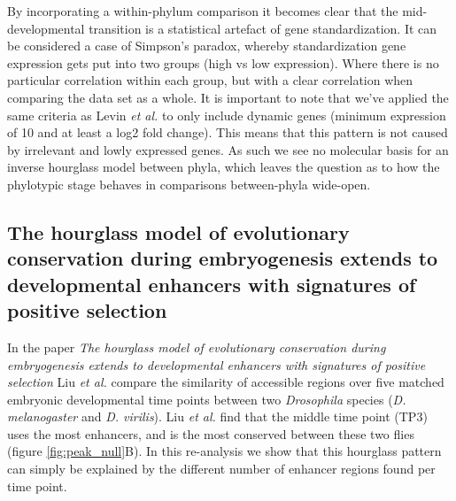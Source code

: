 By incorporating a within-phylum comparison it becomes clear that the mid-developmental transition is a statistical artefact of gene standardization. It can be considered a case of Simpson's paradox, whereby standardization gene expression gets put into two groups (high vs low expression). Where there is no particular correlation within each group, but with a clear correlation when comparing the data set as a whole\cite{Saccenti2023}. It is important to note that we've applied the same criteria as Levin \textit{et al.} to only include dynamic genes (minimum expression of 10 and at least a log2 fold change). This means that this pattern is not caused by irrelevant and lowly expressed genes. As such we see no molecular basis for an inverse hourglass model between phyla, which leaves the question as to how the phylotypic stage behaves in comparisons between-phyla wide-open.

\subsection{The hourglass model of evolutionary conservation during embryogenesis extends to developmental enhancers with signatures of positive selection} \label{subsection:liu}

In the paper \textit{The hourglass model of evolutionary conservation during embryogenesis extends to developmental enhancers with signatures of positive selection} Liu \textit{et al.} compare the similarity of accessible regions over five matched embryonic developmental time points between two \textit{Drosophila} species (\textit{D. melanogaster} and \textit{D. virilis}). Liu \textit{et al.} find that the middle time point (TP3) uses the most enhancers, and is the most conserved between these two flies (figure \ref{fig:peak_null}B). In this re-analysis we show that this hourglass pattern can simply be explained by the different number of enhancer regions found per time point.

